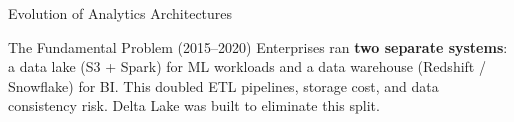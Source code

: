 \documentclass[aspectratio=169,10pt]{beamer}
\begin{document}
\begin{frame}{Evolution of Analytics Architectures}
\begin{center}
  \end{center}
  \vspace{6pt}
  \begin{alertblock}{The Fundamental Problem (2015--2020)}
    Enterprises ran \textbf{two separate systems}: a data lake (S3 + Spark)
    for ML workloads and a data warehouse (Redshift / Snowflake) for BI.
    This doubled ETL pipelines, storage cost, and data consistency risk.
    Delta Lake was built to eliminate this split.
  \end{alertblock}
\end{frame}
\end{document}
